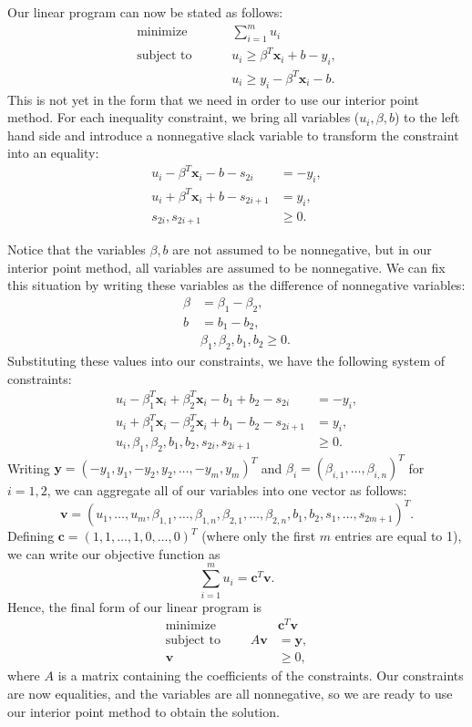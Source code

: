 Our linear program can now be stated as follows:
\begin{align*}
\text{minimize }\qquad &\sum_{i=1}^m u_i\\
\text{subject to }\qquad &u_i \geq \beta^T\mathbf{x}_i + b - y_i,\\
&u_i \geq y_i - \beta^T\mathbf{x}_i - b.
\end{align*}
This is not yet in the form that we need in order to use our interior point method.
For each inequality constraint, we bring all variables ($u_i, \beta, b$) to the left hand side and
introduce a nonnegative slack variable to transform the constraint into an equality:
\begin{align*}
u_i  - \beta^T\mathbf{x}_i - b - s_{2i}&= -y_i,\\
u_i +\beta^T\mathbf{x}_i + b - s_{2i+1}&= y_i,\\
s_{2i}, s_{2i+1}&\geq 0.
\end{align*}

Notice that the variables $\beta, b$ are not assumed to be nonnegative, but in our interior point method, all variables are assumed
to be nonnegative. We can fix this situation by writing these variables as the difference of nonnegative variables:
\begin{align*}
  \beta &= \beta_1 - \beta_2,\\
  b &= b_1 - b_2,\\
  &\beta_1, \beta_2, b_1, b_2 \geq 0.
\end{align*}
Substituting these values into our constraints, we have the following system of constraints:
\begin{align*}
u_i  - \beta_1^T\mathbf{x}_i + \beta_2^T\mathbf{x}_i - b_1 + b_2 - s_{2i}&= -y_i,\\
u_i + \beta_1^T\mathbf{x}_i - \beta_2^T\mathbf{x}_i + b_1 - b_2 - s_{2i+1}&= y_i,\\
u_i, \beta_1, \beta_2, b_1, b_2, s_{2i}, s_{2i+1}&\geq 0.
\end{align*}
Writing $\mathbf{y} = (-y_1, y_1, -y_2, y_2, \ldots, -y_m, y_m)^T$ and $\beta_i = (\beta_{i,1}, \ldots, \beta_{i,n})^T$ for $i = 1, 2$,
we can aggregate all of our variables into one vector as follows:
\[
\mathbf{v} = (u_1,\ldots, u_m, \beta_{1,1},\ldots, \beta_{1,n}, \beta_{2,1},\ldots, \beta_{2,n}, b_1, b_2, s_1,\ldots,s_{2m+1})^T.
\]
Defining $\mathbf{c} = (1, 1, \ldots, 1, 0, \ldots, 0)^T$ (where only the first $m$ entries are equal to 1), we can write our
objective function as
\[
\sum_{i=1}^m u_i = \mathbf{c}^T\mathbf{v}.
\]
Hence, the final form of our linear program is
\begin{align*}
  \text{minimize }\qquad &\mathbf{c}^T\mathbf{v}\\
  \text{subject to }\qquad A\mathbf{v} &= \mathbf{y},\\
  \mathbf{v} &\geq 0,
\end{align*}
where $A$ is a matrix containing the coefficients of the constraints.
Our constraints are now equalities, and the variables are all nonnegative, so we are ready to use our interior point method to obtain
the solution.

